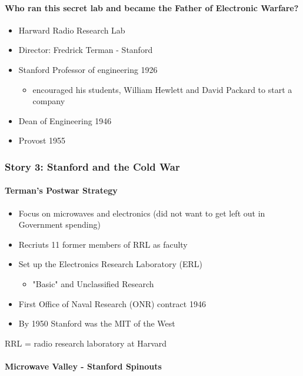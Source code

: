 \paragraph{Who ran this secret lab and became the Father of Electronic Warfare?}

\begin{itemize}
    \item Harward Radio Research Lab
    \item Director: Fredrick Terman - Stanford
    \item Stanford Professor of engineering 1926
        \begin{itemize}
            \item encouraged his students, William Hewlett and David Packard to
                start a company
        \end{itemize}
    \item Dean of Engineering 1946
    \item Provost 1955
\end{itemize}


\subsubsection{Story 3: Stanford and the Cold War}

\paragraph{Terman's Postwar Strategy}

\begin{itemize}
    \item Focus on microwaves and electronics (did not want to get left out
        in Government spending)
    \item Recriuts 11 former members of RRL as faculty
    \item Set up the Electronics Research Laboratory (ERL)
        \begin{itemize}
            \item "Basic" and Unclassified Research
        \end{itemize}
    \item First Office of Naval Research (ONR) contract 1946
    \item By 1950 Stanford was the MIT of the West
\end{itemize}
RRL = radio research laboratory at Harvard

\paragraph{Microwave Valley - Stanford Spinouts}

